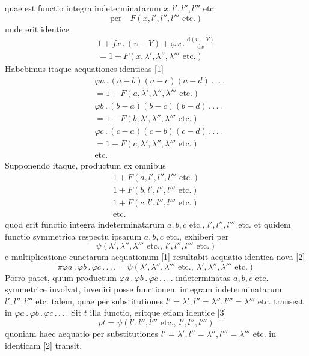 quae est functio integra indeterminatarum $x,l',l'',l'''$ etc.
\[
\text{per}\quad F(x,l',l'',l'''\text{ etc.})
\]
unde erit identice
\[
\begin{gathered}1+fx\, .\,(\upsilon-Y)+\varphi x\, .\,\frac{\mathrm d(\upsilon-Y)}{\mathrm dx}\\=1+F(x,\lambda',\lambda'',\lambda'''\text{ etc.})\end{gathered}
\]
Habebimus itaque aequationes identicas [1]
\[
\begin{aligned}
&\varphi a\, .\,(a-b)(a-c)(a-d)\, .\, .\, .\, .\\&=1+F(a,\lambda',\lambda'',\lambda'''\text{ etc.})\\
&\varphi b\, .\,(b-a)(b-c)(b-d)\, .\, .\, .\, .\\&=1+F(b,\lambda',\lambda'',\lambda'''\text{ etc.})\\
&\varphi c\, .\,(c-a)(c-b)(c-d)\, .\, .\, .\, .\\&=1+F(c,\lambda',\lambda'',\lambda'''\text{ etc.})\\
&\text{etc.}
\end{aligned}
\]
Supponendo itaque, productum ex omnibus
\[
\begin{gathered}
1+F(a,l',l'',l'''\text{ etc.})\\
1+F(b,l',l'',l'''\text{ etc.})\\
1+F(c,l',l'',l'''\text{ etc.})\\
\text{etc.}
\end{gathered}
\]
quod erit functio integra indeterminatarum $a,b,c$ etc., $l',l'',l'''$ etc. et quidem
functio symmetrica respectu ipsarum $a,b,c$ etc., exhiberi per
\[
\psi(\lambda',\lambda'',\lambda'''\text{ etc.},\ l',l'',l'''\text{ etc.})
\]
e multiplicatione cunctarum aequationum [1] resultabit aequatio identica nova [2]
\[
\pi\varphi a\, .\,\varphi b\, .\,\varphi c\, .\, .\, .\, .=\psi(\lambda',\lambda'',\lambda'''\text{ etc.},\ \lambda',\lambda'',\lambda'''\text{ etc.})
\]
Porro patet, quum productum $\varphi a\, .\,\varphi b\, .\,\varphi c\, .\, .\, .\, .$ indeterminatas $a,b,c$ etc.
symmetrice involvat, inveniri posse functionem integram indeterminatarum
$l',l'',l'''$ etc. talem, quae per substitutiones $l'=\lambda',l''=\lambda'',l'''=\lambda'''$ etc. transeat
in $\varphi a\, .\,\varphi b\, .\,\varphi c\, .\, .\, .\, .$ Sit $t$ illa functio, eritque etiam identice [3]
\[
pt=\psi(l',l'',l'''\text{ etc.},\ l',l'',l''')
\]
quoniam haec aequatio per substitutiones $l'=\lambda',l''=\lambda'',l'''=\lambda'''$ etc. in identicam [2] transit.

